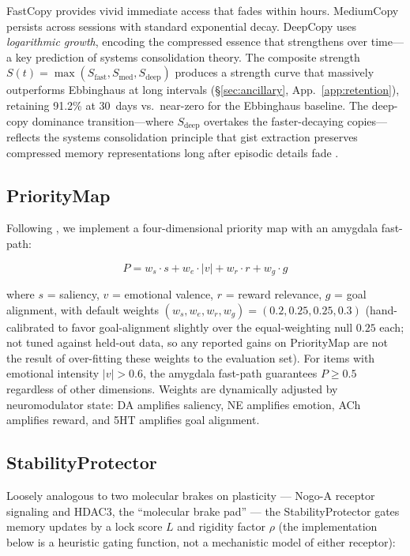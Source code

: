\documentclass{article}
\begin{document}
FastCopy provides vivid immediate access that fades within hours.
MediumCopy persists across sessions with standard exponential decay.
DeepCopy uses \emph{logarithmic growth}, encoding the compressed
essence that strengthens over time---a key prediction of
systems consolidation theory.
The composite strength $S(t) = \max(S_{\text{fast}}, S_{\text{med}}, S_{\text{deep}})$
produces a strength curve that massively outperforms Ebbinghaus at
long intervals (\S\ref{sec:ancillary}, App.~\ref{app:retention}),
retaining 91.2\% at 30~days vs.\ near-zero for the Ebbinghaus baseline.
The deep-copy dominance transition---where $S_{\text{deep}}$ overtakes
the faster-decaying copies---reflects the systems consolidation
principle that gist extraction preserves compressed memory
representations long after episodic details fade \citep{kumaran2016}.

\subsection{PriorityMap}
\label{sec:priority}

Following \citet{chelazzi2014}, we implement a four-dimensional priority map
with an amygdala fast-path:

\begin{equation}
    P = w_s \cdot s + w_e \cdot |v| + w_r \cdot r + w_g \cdot g
\end{equation}

where $s$ = saliency, $v$ = emotional valence, $r$ = reward relevance,
$g$ = goal alignment, with default weights
$(w_s, w_e, w_r, w_g) = (0.2, 0.25, 0.25, 0.3)$ (hand-calibrated to
favor goal-alignment slightly over the equal-weighting null
$0.25$ each; not tuned against held-out data, so any reported gains
on PriorityMap are not the result of over-fitting these weights to
the evaluation set).
For items with emotional intensity $|v| > 0.6$, the amygdala fast-path
guarantees $P \geq 0.5$ regardless of other dimensions.
Weights are dynamically adjusted by neuromodulator state:
DA amplifies saliency, NE amplifies emotion, ACh amplifies reward,
and 5HT amplifies goal alignment.

\subsection{StabilityProtector}
\label{sec:stability}

Loosely analogous to two molecular brakes on plasticity --- Nogo-A
receptor signaling \citep{schwab2010nogoa,karlen2009nogo,kempfblock2014nogoa}
and HDAC3, the ``molecular brake pad''
\citep{mcquown2011hdac3,mcquown2011brakepad} --- the StabilityProtector
gates memory updates by a lock score $L$ and rigidity factor $\rho$
(the implementation below is a heuristic gating function, not a
mechanistic model of either receptor):
\end{document}
